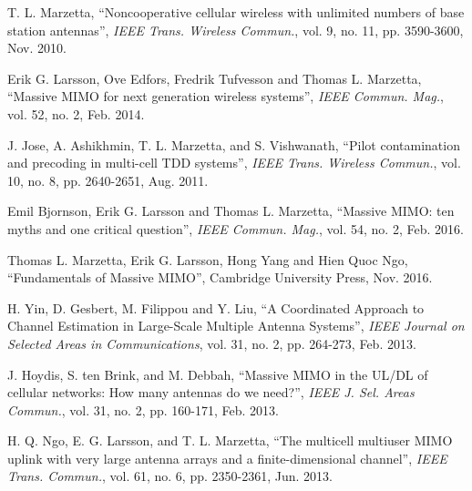 \documentclass[10pt,journal,comsoc,final]{IEEEtran}
\begin{document}
\begin{thebibliography}{1}

T. L. Marzetta, \textquotedblleft{Noncooperative cellular wireless with unlimited numbers of base station antennas\textquotedblright}, \emph{IEEE Trans. Wireless Commun.}, vol. 9, no. 11, pp. 3590-3600, Nov. 2010.

Erik G. Larsson, Ove Edfors, Fredrik Tufvesson and Thomas L. Marzetta, \textquotedblleft{Massive MIMO for next generation wireless systems\textquotedblright}, \emph{IEEE Commun. Mag.}, vol. 52, no. 2, Feb. 2014.

J. Jose, A. Ashikhmin, T. L. Marzetta, and S. Vishwanath, \textquotedblleft{Pilot contamination and precoding in multi-cell TDD systems\textquotedblright},  \emph{IEEE Trans. Wireless Commun.}, vol. 10, no. 8, pp. 2640-2651, Aug. 2011.

Emil Bjornson, Erik G. Larsson and Thomas L. Marzetta, \textquotedblleft{Massive MIMO: ten myths and one critical question\textquotedblright}, \emph{IEEE Commun. Mag.}, vol. 54, no. 2, Feb. 2016.

Thomas L. Marzetta, Erik G. Larsson, Hong Yang and Hien Quoc Ngo, \textquotedblleft{Fundamentals of Massive MIMO\textquotedblright}, Cambridge University Press, Nov. 2016.

H. Yin, D. Gesbert, M. Filippou and Y. Liu, \textquotedblleft{A Coordinated Approach to Channel Estimation in Large-Scale Multiple Antenna Systems\textquotedblright}, \emph{IEEE Journal on Selected Areas in Communications}, vol. 31, no. 2, pp. 264-273, Feb. 2013.

J. Hoydis, S. ten Brink, and M. Debbah, \textquotedblleft{Massive MIMO in the UL/DL of cellular networks: How many antennas do we need?\textquotedblright}, \emph{IEEE J. Sel. Areas Commun.}, vol. 31, no. 2, pp. 160-171, Feb. 2013.

H. Q. Ngo, E. G. Larsson, and T. L. Marzetta, \textquotedblleft{The multicell multiuser MIMO uplink with very large antenna arrays and a finite-dimensional channel\textquotedblright}, \emph{IEEE Trans. Commun.}, vol. 61, no. 6, pp. 2350-2361, Jun. 2013.


\end{thebibliography}
\end{document}
